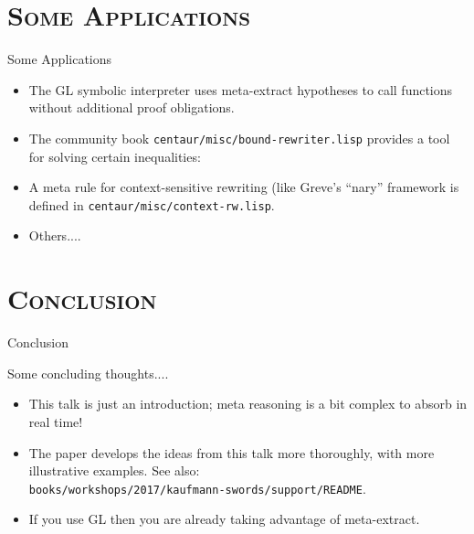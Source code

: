 \section[\scshape Applications]{\scshape Some Applications}
\begin{frame}[fragile] {Some Applications}

\begin{itemize}

\item The GL symbolic interpreter uses meta-extract hypotheses to
  call functions without additional proof obligations.

\item The community book {\tt centaur/misc/bound-rewriter.lisp}
  provides a tool for solving certain inequalities:

\item A meta rule for context-sensitive rewriting (like Greve's
  ``nary'' framework is defined in {\tt centaur/misc/context-rw.lisp}.

\item Others....

\end{itemize}

\end{frame}
\section{\scshape Conclusion}
\begin{frame}[fragile] {Conclusion}

Some concluding thoughts....

\begin{itemize}

\item This talk is just an introduction; meta reasoning is a bit
  complex to absorb in real time!

\item The paper develops the ideas from this talk more thoroughly,
  with more illustrative examples.  See also: \\
  {\tt books/workshops/2017/kaufmann-swords/support/README}.

\item If you use GL then you are already taking advantage of
  meta-extract.

\end{itemize}

\end{frame}

